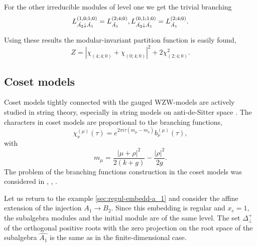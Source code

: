 \documentclass[12pt]{iopart}
\theoremstyle{definition}
\theoremstyle{definition}
\theoremstyle{definition}
\begin{document}
For the other irreducible modules of level one  we get the trivial
branching
\begin{equation*}
  \label{eq:44}
   L^{(1,0;1;0)}_{\hat{A_2}\downarrow \hat{A_1}}= L_{\hat{A_1}}^{(2;4;0)},\\
   L^{(0,1;1;0)}_{\hat{A_2}\downarrow \hat{A_1}}= L_{\hat{A_1}}^{(2;4;0)}.
\end{equation*}

Using these results the modular-invariant partition function is easily found,
\begin{equation*}
  \label{eq:45}
  Z=\left|\chi_{(4;4;0)}+\chi_{(0;4;0)}\right|^2+2\chi_{(2;4;0)}^2.
\end{equation*}

\subsection{Coset models}
\label{sec:coset-models}

Coset models \cite{Goddard198588} tightly connected with the gauged WZW-models are actively studied
in string theory, especially in string models on anti-de-Sitter space
\cite{Maldacena:2000hw,Maldacena:2000kv,Maldacena:2001km,Maldacena:2001ky,Aharony:1999ti}.
The characters in coset models are proportional to the branching functions,
\begin{equation}
  \label{eq:31}
  \chi^{(\mu)}_{\nu}(\tau)=e^{2\pi i \tau (m_{\mu}-m_{\nu})} b^{(\mu)}_{\nu}(\tau),
\end{equation}
with
\begin{equation*}
  \label{eq:46}
  m_{\mu}=\frac{\left|\mu+\rho\right|^2}{2(k+g)}-\frac{\left|\rho\right|^2}{2g}.
\end{equation*}
The problem of the branching functions construction in the coset models was considered
in  \cite{Dunbar:1992gh}, \cite{Hwang:1994yr}, \cite{lu1994branching}.

Let us return to the example \ref{sec:regul-embedd-a_1} and consider the affine extension of the injection
$A_1 \longrightarrow B_2$.
Since this embedding is regular and $x_e=1$, the subalgebra modules and the initial module are of the same level.
The set $\Delta^{+}_{\bot}$ of the orthogonal positive roots with the zero projection
on the root space of the subalgebra $\hat{A_1}$ is the same as in the finite-dimensional case.
\end{document}
